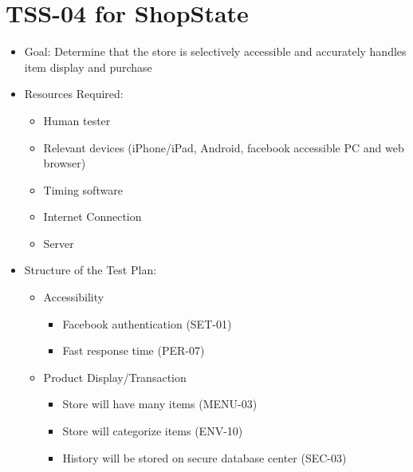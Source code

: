 \section{TSS-04 for ShopState}
\begin{itemize}
\item Goal: Determine that the store is selectively accessible and accurately handles item display and purchase

\item Resources Required:
\begin{itemize}
\item Human tester
\item Relevant devices (iPhone/iPad, Android, facebook accessible PC and web browser)
\item Timing software
\item Internet Connection 
\item Server
\end{itemize}

\item Structure of the Test Plan:
\begin{itemize}
\item Accessibility
\begin{itemize}
\item Facebook authentication (SET-01)
\item Fast response time (PER-07)
\end{itemize}
\item Product Display/Transaction
\begin{itemize}
\item Store will have many items (MENU-03)
\item Store will categorize items (ENV-10)
\item History will be stored on secure database center (SEC-03)
\end{itemize}
\end{itemize}
\end{itemize}

